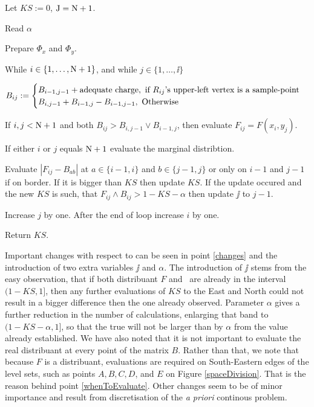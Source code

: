 \begin{minipage}[h]{\linewidth}
\begin{algorithm}
	\item Let $KS := 0$, $\mathrm{J} = \mathrm{N}+1$. 
	\item Read $\alpha$
	\item Prepare $\Phi_x$ and $\Phi_y$.
	\item While $i \in \{1, \dots, \mathrm{N}+1\}$, and while $j \in \{ 1, \dots, \ii \}$ 
	\begin{algorithm}
		\item $B_{ij} := 
			\begin{cases} 
				B_{i-1,j-1} + \text{adequate charge}, \text{ if $R_{ij}$'s upper-left vertex is a sample-point} \cr
				B_{i,j-1} + B_{i-1,j} -  B_{i-1,j-1}, \text{ Otherwise} 
			\end{cases}$	

		\item\label{whenToEvaluate} If $i,j < \mathrm{N}+1$ and both $B_{ij} > B_{i,j-1} \vee B_{i-1,j}$, then evaluate $F_{ij} = F(x_i, y_j)$.

		\item If either $i$ or $j$ equals $\mathrm{N}+1$ evaluate the marginal distribtion.

		\item\label{changes} Evaluate $|F_{ij} - B_{ab}|$ at $a \in \{i-1,i\}$ and $b \in \{j-1,j\}$ or only on $i-1$ and $j-1$ if on border. If it is bigger than $KS$ then update $KS$. If the update occured and the new $KS$ is such, that $F_{ij}\wedge B_{ij} > 1 - KS - \alpha$ then update $\jj$ to $j-1$.

		\item Increase $j$ by one. After the end of loop increase $i$ by one.

	\end{algorithm}
	\item Return $KS$.
\end{algorithm}
\end{minipage}



Important changes with respect to \cite{NiVingron} can be seen in point \ref{changes} and the introduction of two extra variables $\jj$ and $\alpha$. The introduction of $\jj$ stems from the easy observation, that if both distribuant $F$ and \Fecdf\, are already in the interval $(1-KS,1]$, then any further evaluations of $KS$ to the East and North could not result in a bigger difference then the one already observed. Parameter $\alpha$ gives a further reduction in the number of calculations, enlarging that band to $(1-KS-\alpha,1]$, so that the true \KS will not be larger than by $\alpha$ from the value already established. We have also noted that it is not important to evaluate the real distribuant at every point of the matrix $B$. Rather than that, we note that because $F$ is a distribuant, evaluations are required on South-Eastern edges of the level sets, such as points $A, B, C, D$, and $E$ on Figure \ref{spaceDivision}. That is the reason behind point \ref{whenToEvaluate}. Other changes seem to be of minor importance and result from discretisation of the {\it a priori} continous problem. 


